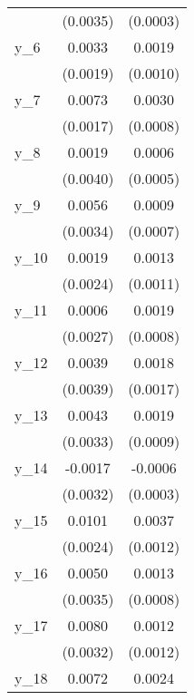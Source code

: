 {\begin{tabular}{l*{2}{c}}
            &    (0.0035)        &    (0.0003)        \\
[1em]
y\_6         &      0.0033\sym{*} &      0.0019\sym{*} \\
            &    (0.0019)        &    (0.0010)        \\
[1em]
y\_7         &      0.0073\sym{**}&      0.0030\sym{**}\\
            &    (0.0017)        &    (0.0008)        \\
[1em]
y\_8         &      0.0019        &      0.0006        \\
            &    (0.0040)        &    (0.0005)        \\
[1em]
y\_9         &      0.0056\sym{*} &      0.0009        \\
            &    (0.0034)        &    (0.0007)        \\
[1em]
y\_10        &      0.0019        &      0.0013        \\
            &    (0.0024)        &    (0.0011)        \\
[1em]
y\_11        &      0.0006        &      0.0019\sym{**}\\
            &    (0.0027)        &    (0.0008)        \\
[1em]
y\_12        &      0.0039        &      0.0018        \\
            &    (0.0039)        &    (0.0017)        \\
[1em]
y\_13        &      0.0043        &      0.0019\sym{**}\\
            &    (0.0033)        &    (0.0009)        \\
[1em]
y\_14        &     -0.0017        &     -0.0006\sym{**}\\
            &    (0.0032)        &    (0.0003)        \\
[1em]
y\_15        &      0.0101\sym{**}&      0.0037\sym{**}\\
            &    (0.0024)        &    (0.0012)        \\
[1em]
y\_16        &      0.0050        &      0.0013\sym{*} \\
            &    (0.0035)        &    (0.0008)        \\
[1em]
y\_17        &      0.0080\sym{**}&      0.0012        \\
            &    (0.0032)        &    (0.0012)        \\
[1em]
y\_18        &      0.0072\sym{**}&      0.0024\sym{**}\\

\end{tabular}}
